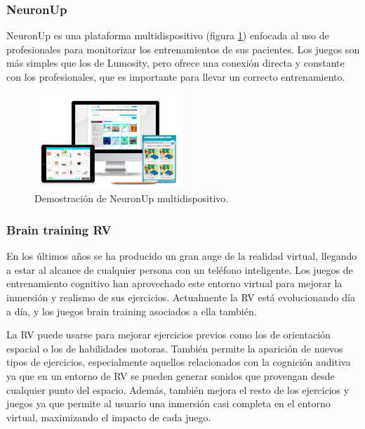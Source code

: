 \subsubsection{NeuronUp}

NeuronUp es una plataforma multidispositivo (figura \ref{fig:EA_neuronUp}) enfocada al uso de profesionales para monitorizar los entrenamientos de sus pacientes. Los juegos son más simples que los de Lumosity, pero ofrece una conexión directa y constante con los profesionales, que es importante para llevar un correcto entrenamiento.

\begin{figure}
  \centering
\includegraphics[width=0.5\textwidth]{03.EstudioProblema/01.EstadoArte/00.Figuras/06.neuronup.jpg}
    \caption{Demostración de NeuronUp multidispositivo. \cite{EA_img_neuronup}}
    \label{fig:EA_neuronUp}
\end{figure}


\subsubsection{Brain training RV}

En los últimos años se ha producido un gran auge de la realidad virtual, llegando a estar al alcance de cualquier persona con un teléfono inteligente. Los juegos de entrenamiento cognitivo han aprovechado este entorno virtual para mejorar la inmersión y realismo de sus ejercicios. Actualmente la RV está evolucionando día a día, y los juegos brain training asociados a ella también.

La RV puede usarse para mejorar ejercicios previos como los de orientación espacial o los de habilidades motoras. También permite la aparición de nuevos tipos de ejercicios, especialmente aquellos relacionados con la cognición auditiva ya que en un entorno de RV se pueden generar sonidos que provengan desde cualquier punto del espacio. Además, también mejora el resto de los ejercicios y juegos ya que permite al usuario una inmersión casi completa en el entorno virtual, maximizando el impacto de cada juego.


